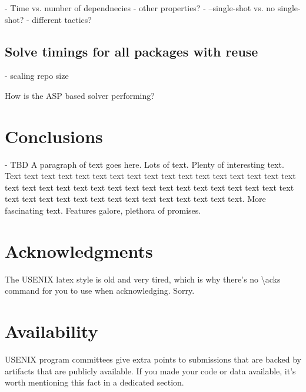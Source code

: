 











- Time vs. number of dependnecies
- other properties?
- --single-shot vs. no single-shot?
- different tactics?

\subsection{Solve timings for all packages with reuse}
- scaling repo size


How is the ASP based solver performing?

\section{Conclusions}
- TBD
A paragraph of text goes here. Lots of text. Plenty of interesting
text. Text text text text text text text text text text text text text
text text text text text text text text text text text text text text
text text text text text text text text text text text text text text
text text text text text text text.
More fascinating text. Features galore, plethora of promises.

\section*{Acknowledgments}
The USENIX latex style is old and very tired, which is why
there's no \textbackslash{}acks command for you to use when
acknowledging. Sorry.

\section*{Availability}

USENIX program committees give extra points to submissions that are
backed by artifacts that are publicly available. If you made your code
or data available, it's worth mentioning this fact in a dedicated
section.


